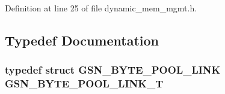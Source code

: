 Definition at line 25 of file dynamic\_\-mem\_\-mgmt.h.



\subsection{Typedef Documentation}
\hypertarget{a00470_a43b2d3e37533f60e9239424355b31657}{
\subsubsection[{GSN\_\-BYTE\_\-POOL\_\-LINK\_\-T}]{\setlength{\rightskip}{0pt plus 5cm}typedef struct {\bf GSN\_\-BYTE\_\-POOL\_\-LINK} {\bf GSN\_\-BYTE\_\-POOL\_\-LINK\_\-T}}}
\label{a00470_a43b2d3e37533f60e9239424355b31657}


